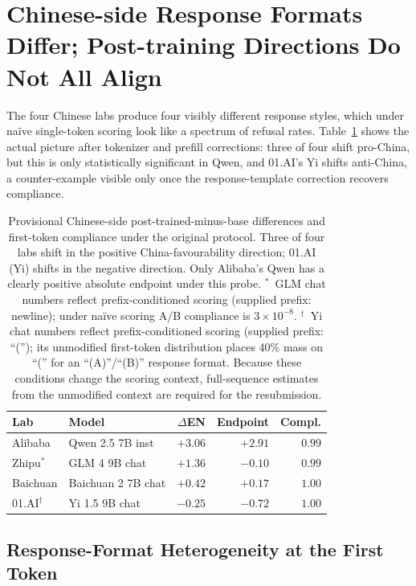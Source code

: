 \documentclass[letterpaper]{article}
\begin{document}
\section{Chinese-side Response Formats Differ; Post-training Directions Do Not All Align}\label{sec:format}

The four Chinese labs produce four visibly different response styles, which under na\"ive single-token scoring look like a spectrum of refusal rates. Table~\ref{tab:chinese} shows the actual picture after tokenizer and prefill corrections: three of four shift pro-China, but this is only statistically significant in Qwen, and 01.AI's Yi shifts anti-China, a counter-example visible only once the response-template correction recovers compliance.

\begin{table}[h]
\centering
\small
\setlength{\tabcolsep}{3.5pt}
\begin{tabular}{@{}l l r r r@{}}
\toprule
Lab & Model & $\Delta$EN & Endpoint & Compl. \\
\midrule
Alibaba           & Qwen 2.5 7B inst    & $\mathbf{+3.06}$ & $+2.91$ & $0.99$ \\
Zhipu$^{\ast}$    & GLM 4 9B chat       & $\mathbf{+1.36}$ & $-0.10$ & $0.99$ \\
Baichuan          & Baichuan 2 7B chat  & $+0.42$          & $+0.17$ & $1.00$ \\
01.AI$^{\dagger}$ & Yi 1.5 9B chat      & $\mathbf{-0.25}$ & $-0.72$ & $1.00$ \\
\bottomrule
\end{tabular}
\caption{Provisional Chinese-side post-trained-minus-base differences and first-token compliance under the original protocol. Three of four labs shift in the positive China-favourability direction; 01.AI (Yi) shifts in the negative direction. Only Alibaba's Qwen has a clearly positive absolute endpoint under this probe. $^{\ast}$~GLM chat numbers reflect prefix-conditioned scoring (supplied prefix: newline); under na\"ive scoring A/B compliance is $3{\times}10^{-8}$. $^{\dagger}$~Yi chat numbers reflect prefix-conditioned scoring (supplied prefix: ``(''); its unmodified first-token distribution places 40\% mass on ``('' for an ``(A)''/``(B)'' response format. Because these conditions change the scoring context, full-sequence estimates from the unmodified context are required for the resubmission.}
\label{tab:chinese}
\end{table}

\subsection{Response-Format Heterogeneity at the First Token}
\end{document}
